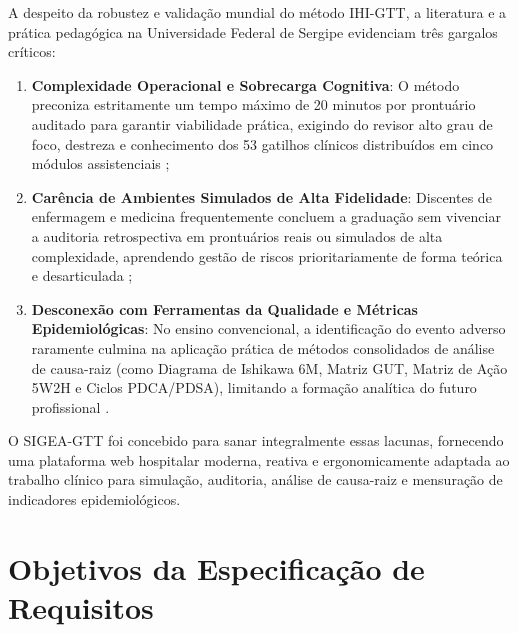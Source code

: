 A despeito da robustez e validação mundial do método IHI-GTT, a literatura e a prática pedagógica na Universidade Federal de Sergipe evidenciam três gargalos críticos:
\begin{enumerate}
    \item \textbf{Complexidade Operacional e Sobrecarga Cognitiva}: O método preconiza estritamente um tempo máximo de 20 minutos por prontuário auditado para garantir viabilidade prática, exigindo do revisor alto grau de foco, destreza e conhecimento dos 53 gatilhos clínicos distribuídos em cinco módulos assistenciais \cite{griffin2009ihi};
    \item \textbf{Carência de Ambientes Simulados de Alta Fidelidade}: Discentes de enfermagem e medicina frequentemente concluem a graduação sem vivenciar a auditoria retrospectiva em prontuários reais ou simulados de alta complexidade, aprendendo gestão de riscos prioritariamente de forma teórica e desarticulada \cite{patricio2021seguranca};
    \item \textbf{Desconexão com Ferramentas da Qualidade e Métricas Epidemiológicas}: No ensino convencional, a identificação do evento adverso raramente culmina na aplicação prática de métodos consolidados de análise de causa-raiz (como Diagrama de Ishikawa 6M, Matriz GUT, Matriz de Ação 5W2H e Ciclos PDCA/PDSA), limitando a formação analítica do futuro profissional \cite{ishikawa1982,campos1992,deming1986}.
\end{enumerate}

O SIGEA-GTT foi concebido para sanar integralmente essas lacunas, fornecendo uma plataforma web hospitalar moderna, reativa e ergonomicamente adaptada ao trabalho clínico para simulação, auditoria, análise de causa-raiz e mensuração de indicadores epidemiológicos.

\section{Objetivos da Especificação de Requisitos}
\label{sec_objetivos_especificacao}

